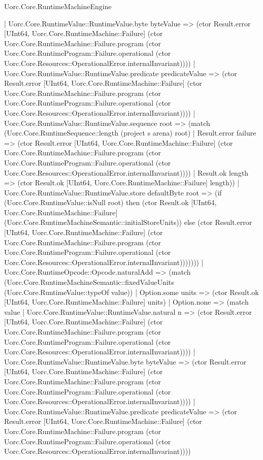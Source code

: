 \begin{lexlean}{Uorc.Core.RuntimeMachineEngine}
\begin{semanticmodule}
{              | Uorc.Core.RuntimeValue::RuntimeValue.byte byteValue => (ctor Result.error [UInt64, Uorc.Core.RuntimeMachine::Failure] (ctor Uorc.Core.RuntimeMachine::Failure.program (ctor Uorc.Core.RuntimeProgram::Failure.operational (ctor Uorc.Core.Resources::OperationalError.internalInvariant))))
              | Uorc.Core.RuntimeValue::RuntimeValue.predicate predicateValue => (ctor Result.error [UInt64, Uorc.Core.RuntimeMachine::Failure] (ctor Uorc.Core.RuntimeMachine::Failure.program (ctor Uorc.Core.RuntimeProgram::Failure.operational (ctor Uorc.Core.Resources::OperationalError.internalInvariant))))
              | Uorc.Core.RuntimeValue::RuntimeValue.sequence root => (match (Uorc.Core.RuntimeSequence::length (project s arena) root)
                | Result.error failure => (ctor Result.error [UInt64, Uorc.Core.RuntimeMachine::Failure] (ctor Uorc.Core.RuntimeMachine::Failure.program (ctor Uorc.Core.RuntimeProgram::Failure.operational (ctor Uorc.Core.Resources::OperationalError.internalInvariant))))
                | Result.ok length => (ctor Result.ok [UInt64, Uorc.Core.RuntimeMachine::Failure] length))
              | Uorc.Core.RuntimeValue::RuntimeValue.store defaultByte root => (if (Uorc.Core.RuntimeValue::isNull root) then (ctor Result.ok [UInt64, Uorc.Core.RuntimeMachine::Failure] (Uorc.Core.RuntimeMachineSemantic::initialStoreUnits)) else (ctor Result.error [UInt64, Uorc.Core.RuntimeMachine::Failure] (ctor Uorc.Core.RuntimeMachine::Failure.program (ctor Uorc.Core.RuntimeProgram::Failure.operational (ctor Uorc.Core.Resources::OperationalError.internalInvariant)))))))
          | Uorc.Core.RuntimeOpcode::Opcode.naturalAdd => (match (Uorc.Core.RuntimeMachineSemantic::fixedValueUnits (Uorc.Core.RuntimeValue::typeOf value))
            | Option.some units => (ctor Result.ok [UInt64, Uorc.Core.RuntimeMachine::Failure] units)
            | Option.none => (match value
              | Uorc.Core.RuntimeValue::RuntimeValue.natural n => (ctor Result.error [UInt64, Uorc.Core.RuntimeMachine::Failure] (ctor Uorc.Core.RuntimeMachine::Failure.program (ctor Uorc.Core.RuntimeProgram::Failure.operational (ctor Uorc.Core.Resources::OperationalError.internalInvariant))))
              | Uorc.Core.RuntimeValue::RuntimeValue.byte byteValue => (ctor Result.error [UInt64, Uorc.Core.RuntimeMachine::Failure] (ctor Uorc.Core.RuntimeMachine::Failure.program (ctor Uorc.Core.RuntimeProgram::Failure.operational (ctor Uorc.Core.Resources::OperationalError.internalInvariant))))
              | Uorc.Core.RuntimeValue::RuntimeValue.predicate predicateValue => (ctor Result.error [UInt64, Uorc.Core.RuntimeMachine::Failure] (ctor Uorc.Core.RuntimeMachine::Failure.program (ctor Uorc.Core.RuntimeProgram::Failure.operational (ctor Uorc.Core.Resources::OperationalError.internalInvariant))))
}
\end{semanticmodule}
\end{lexlean}

